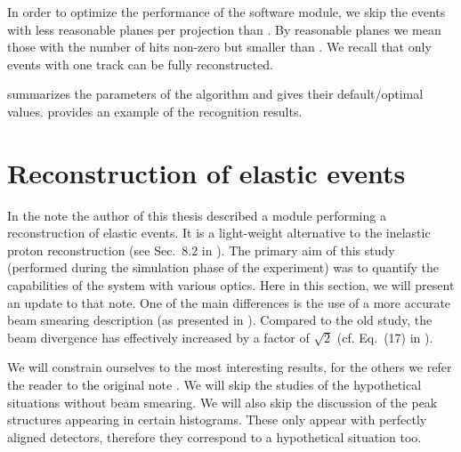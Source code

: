 
In order to optimize the performance of the software module, we skip the events with less reasonable planes per projection than . By reasonable planes we mean those with the number of hits non-zero but smaller than . We recall that only events with one track can be fully reconstructed.

 summarizes the parameters of the algorithm and gives their default/optimal values.  provides an example of the recognition results.



\eject %
\section[elr]{Reconstruction of elastic events}

In the note  the author of this thesis described a module performing a reconstruction of elastic events. It is a light-weight alternative to the inelastic proton reconstruction (see Sec.~8.2 in ). The primary aim of this study (performed during the simulation phase of the experiment) was to quantify the capabilities of the  system with various optics. Here in this section, we will present an update to that note. One of the main differences is the use of a more accurate beam smearing description (as presented in ). Compared to the old study, the beam divergence has effectively increased by a factor of $\sqrt 2$ (cf. Eq.~(17) in ).

We will constrain ourselves to the most interesting results, for the others we refer the reader to the original note . We will skip the studies of the hypothetical situations without beam smearing. We will also skip the discussion of the peak structures appearing in certain histograms. These only appear with perfectly aligned detectors, therefore they correspond to a hypothetical situation too.

